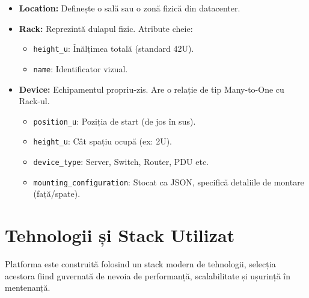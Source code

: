 \documentclass[12pt,a4paper]{article}
\begin{document}
\begin{itemize}
    \item \textbf{Location:} Definește o sală sau o zonă fizică din datacenter.
    \item \textbf{Rack:} Reprezintă dulapul fizic. Atribute cheie:
        \begin{itemize}
            \item \texttt{height\_u}: Înălțimea totală (standard 42U).
            \item \texttt{name}: Identificator vizual.
        \end{itemize}
    \item \textbf{Device:} Echipamentul propriu-zis. Are o relație de tip Many-to-One cu Rack-ul.
        \begin{itemize}
            \item \texttt{position\_u}: Poziția de start (de jos în sus).
            \item \texttt{height\_u}: Cât spațiu ocupă (ex: 2U).
            \item \texttt{device\_type}: Server, Switch, Router, PDU etc.
            \item \texttt{mounting\_configuration}: Stocat ca JSON, specifică detaliile de montare (față/spate).
        \end{itemize}
\end{itemize}

\section{Tehnologii și Stack Utilizat}
\label{sec:tehnologii}

Platforma este construită folosind un stack modern de tehnologii, selecția acestora fiind guvernată de nevoia de performanță, scalabilitate și ușurință în mentenanță.
\end{document}
